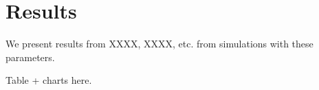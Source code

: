 \section{Results}
We present results from XXXX, XXXX, etc. from simulations with these
parameters.

Table + charts here.

